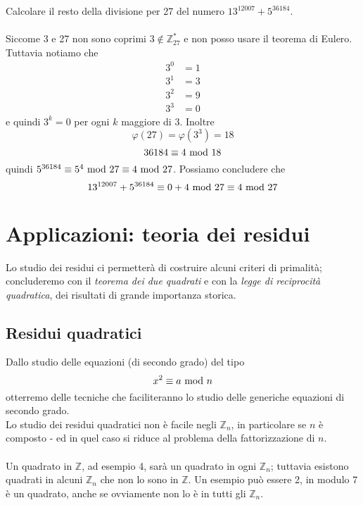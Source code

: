 \begin{esercizio}
	Calcolare il resto della divisione per 27 del numero $13^{12007}+5^{36184}$. \\ \\Siccome 3 e 27 non sono coprimi $3\notin\mathbb{Z}_{27}^*$ e non posso usare il teorema di Eulero. Tuttavia notiamo che
	\begin{align*}
	3^0&=1\\
	3^1&=3\\
	3^2&=9\\
	3^3&=0
	\end{align*}
	e quindi $3^k=0$ per ogni $k$ maggiore di 3. Inoltre
	\begin{equation*}
	\varphi(27)=\varphi(3^3)=18
	\end{equation*}
	\begin{equation*}
	36184\equiv4\ \mathrm{mod}\ 18
	\end{equation*}
	quindi $5^{36184}\equiv5^4\ \mathrm{mod}\ 27\equiv4\ \mathrm{mod}\ 27$. Possiamo concludere che 
	\begin{equation*}
	13^{12007}+5^{36184}\equiv0+4\ \mathrm{mod}\ 27\equiv4\ \mathrm{mod}\ 27
	\end{equation*}
\end{esercizio}




\chapter{Applicazioni: teoria dei residui}
Lo studio dei residui ci permetterà di costruire alcuni criteri di primalità; concluderemo con il \textit{teorema dei due quadrati} e con la \textit{legge di reciprocità quadratica}, dei risultati di grande importanza storica.
\section{Residui quadratici}
\label{lezione9}
Dallo studio delle equazioni (di secondo grado) del tipo
\begin{equation*}
x^2\equiv a\ \mathrm{mod}\ n
\end{equation*}
otterremo delle tecniche che faciliteranno lo studio delle generiche equazioni di secondo grado. \\ Lo studio dei residui quadratici non è facile negli $\mathbb{Z}_n$, in particolare se $n$ è composto - ed in quel caso si riduce al problema della fattorizzazione di $n$. \\ \\ Un quadrato in $\mathbb{Z}$, ad esempio 4, sarà un quadrato in ogni $\mathbb{Z}_n$; tuttavia esistono quadrati in alcuni $\mathbb{Z}_n$ che non lo sono in $\mathbb{Z}$. Un esempio può essere 2, in modulo 7 è un quadrato, anche se ovviamente non lo è in tutti gli $\mathbb{Z}_n$.




